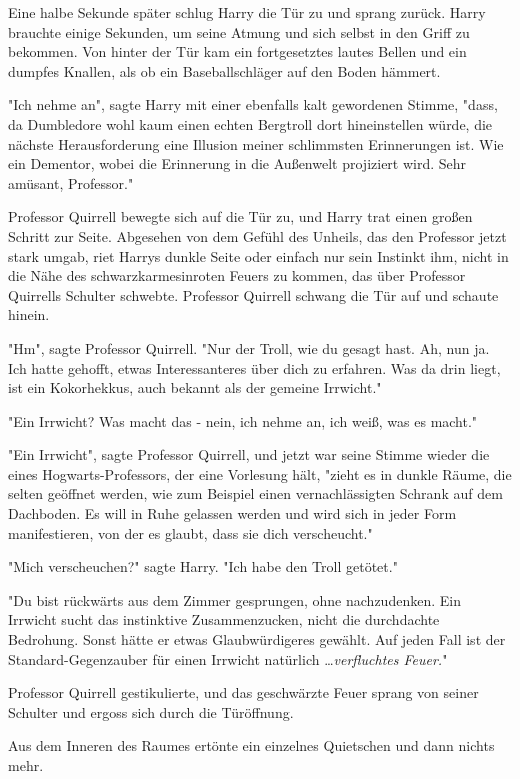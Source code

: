 {Eine halbe Sekunde später schlug Harry die Tür zu und sprang zurück. Harry brauchte einige Sekunden, um seine Atmung und sich selbst in den Griff zu bekommen. Von hinter der Tür kam ein fortgesetztes lautes Bellen und ein dumpfes Knallen, als ob ein Baseballschläger auf den Boden hämmert.

"Ich nehme an", sagte Harry mit einer ebenfalls kalt gewordenen Stimme, "dass, da Dumbledore wohl kaum einen echten Bergtroll dort hineinstellen würde, die nächste Herausforderung eine Illusion meiner schlimmsten Erinnerungen ist. Wie ein Dementor, wobei die Erinnerung in die Außenwelt projiziert wird. Sehr amüsant, Professor."

Professor Quirrell bewegte sich auf die Tür zu, und Harry trat einen großen Schritt zur Seite. Abgesehen von dem Gefühl des Unheils, das den Professor jetzt stark umgab, riet Harrys dunkle Seite oder einfach nur sein Instinkt ihm, nicht in die Nähe des schwarzkarmesinroten Feuers zu kommen, das über Professor Quirrells Schulter schwebte. Professor Quirrell schwang die Tür auf und schaute hinein.

"Hm", sagte Professor Quirrell. "Nur der Troll, wie du gesagt hast. Ah, nun ja. Ich hatte gehofft, etwas Interessanteres über dich zu erfahren. Was da drin liegt, ist ein Kokorhekkus, auch bekannt als der gemeine Irrwicht."

"Ein Irrwicht? Was macht das - nein, ich nehme an, ich weiß, was es macht."

"Ein Irrwicht", sagte Professor Quirrell, und jetzt war seine Stimme wieder die eines Hogwarts-Professors, der eine Vorlesung hält, "zieht es in dunkle Räume, die selten geöffnet werden, wie zum Beispiel einen vernachlässigten Schrank auf dem Dachboden. Es will in Ruhe gelassen werden und wird sich in jeder Form manifestieren, von der es glaubt, dass sie dich verscheucht."

"Mich verscheuchen?" sagte Harry. "Ich habe den Troll getötet."

"Du bist rückwärts aus dem Zimmer gesprungen, ohne nachzudenken. Ein Irrwicht sucht das instinktive Zusammenzucken, nicht die durchdachte Bedrohung. Sonst hätte er etwas Glaubwürdigeres gewählt. Auf jeden Fall ist der Standard-Gegenzauber für einen Irrwicht natürlich …\emph{verfluchtes Feuer.}"

Professor Quirrell gestikulierte, und das geschwärzte Feuer sprang von seiner Schulter und ergoss sich durch die Türöffnung.

Aus dem Inneren des Raumes ertönte ein einzelnes Quietschen und dann nichts mehr.

}

